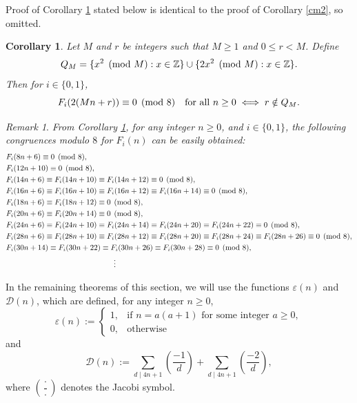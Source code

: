 \documentclass[12pt]{article}
\numberwithin{equation}{section}
\newtheorem{corollary}[theorem]{Corollary}
\theoremstyle{definition}
\theoremstyle{remark}
\newtheorem{remark}[theorem]{Remark}
\numberwithin{equation}{section}
\begin{document}
Proof of Corollary \ref{22} stated below is identical to the proof of Corollary \ref{cm2}, so omitted.
\begin{corollary}\label{22}
Let $M$ and $r$ be integers such that  $M\geq1$ and $0\leq r<M$. Define
\begin{equation}
Q_M=\{x^2 \pmod M:x\in\mathbb{Z}\}\cup\{2x^2 \pmod M:x\in\mathbb{Z}\}.\notag
\end{equation}
Then for $i\in\{0,1\}$,
\begin{equation}
F_i(2(Mn+r))\equiv 0 \pmod 8 \quad \text{for all } n\geq 0
\iff
r\notin Q_M.\notag
\end{equation}
\end{corollary}

\begin{remark}\it From Corollary \ref{22}, for any integer $n\geq 0$, and $i\in\{0,1\}$, the  following  congruences modulo $8$  for $F_i(n)$ can be easily obtained:
\begin{align}
&F_i(8n+6)\equiv 0 \pmod 8,\notag\\
&F_i(12n+10)\equiv 0 \pmod 8,\notag\\
&F_i(14n+6)\equiv F_i(14n+10)\equiv F_i(14n+12)\equiv 0 \pmod 8,\notag\\
&F_i(16n+6)\equiv F_i(16n+10)\equiv F_i(16n+12)\equiv F_i(16n+14)\equiv 0 \pmod 8,\notag\\
&F_i(18n+6)\equiv F_i(18n+12)\equiv 0 \pmod 8,\notag\\
&F_i(20n+6)\equiv F_i(20n+14)\equiv 0 \pmod 8,\notag\\
&F_i(24n+6)\equiv F_i(24n+10)\equiv F_i(24n+14)\equiv F_i(24n+20)\equiv F_i(24n+22)\equiv 0 \pmod 8,\notag\\
&F_i(28n+6)\equiv F_i(28n+10)\equiv F_i(28n+12)\equiv F_i(28n+20)\equiv F_i(28n+24)
\equiv F_i(28n+26)\equiv 0 \pmod 8,\notag\\
&F_i(30n+14)\equiv F_i(30n+22)\equiv F_i(30n+26)\equiv F_i(30n+28)\equiv 0 \pmod 8,\notag\\
&\hspace{5 cm}\vdots\notag
\end{align}
\end{remark}
In the remaining theorems of this section, we will use the functions  $\varepsilon(n)$ and $\mathcal{D}(n)$, which are defined, for any integer $n\geq 0$, 
\begin{equation}\label{e1}
\varepsilon(n):=
\begin{cases}
1, & \text{if } n=a(a+1) \text{ for some  integer } a\geq0,\\
0, & \text{otherwise}
\end{cases}
\end{equation}
and 
\begin{equation}\label{fg2}
\mathcal{D}(n):=
\sum_{d\mid 4n+1}\left(\dfrac{-1}{d}\right)
+
\sum_{d\mid 4n+1}\left(\dfrac{-2}{d}\right),
\end{equation}
where $\left(\dfrac{\cdot}{\cdot}\right)$ denotes the Jacobi symbol. 
\end{document}
